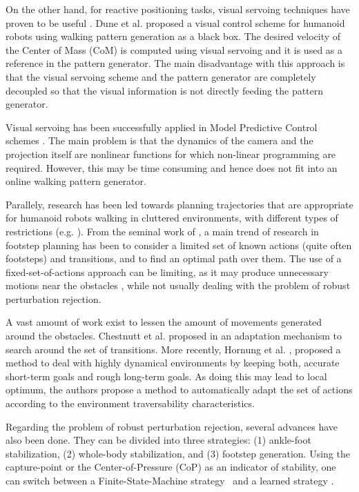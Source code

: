 On the other hand, for reactive positioning tasks, visual servoing techniques have proven to be useful \citep{ChaumetteRAM2006, ChaumetteRAM2007}. Dune et al. \citep{DuneIROS2010} proposed a visual control scheme for humanoid robots using walking pattern generation as a black box. The desired velocity of the Center of Mass (CoM) is computed using visual servoing and it is used as a reference in the pattern generator. The main disadvantage with this approach is that the visual servoing scheme and the pattern generator are completely decoupled so that the visual information is not directly feeding the pattern generator.

Visual servoing has been successfully applied in Model Predictive Control schemes \citep{Allibert2010}. The main problem is that the dynamics of the camera and the projection itself are nonlinear functions for which non-linear programming are required. However, this may be time consuming and hence does not fit into an online walking pattern generator.

Parallely, research has been led towards planning trajectories that are appropriate for humanoid robots walking in cluttered environments, with different types of restrictions (e.g. \citep{Chestnutt2005, jib-IJHR2010}). 
From the seminal work of \citep{Chestnutt2005}, a main trend of research in footstep planning has been to consider a limited set of known actions (quite often footsteps) and transitions, and to find an optimal path over them. The use of a fixed-set-of-actions approach can be limiting, as it may produce unnecessary motions near the obstacles \citep{Bourgeot:IROS:2002}, while not usually dealing with the problem of robust perturbation rejection. 

A vast amount of work exist to lessen the amount of movements generated around the obstacles. Chestnutt et al. proposed in \citep{Chestnutt:ICRA:2007} an adaptation mechanism to search around the set of transitions. More recently, Hornung et al. \citep{Hornung:ICRA:2012}, proposed a method to deal with highly dynamical environments by keeping both, accurate short-term goals and rough long-term goals. As doing this may lead to local optimum, the authors propose a method to automatically adapt the set of actions according to the environment traversability characteristics. 

Regarding the problem of robust perturbation rejection, several advances have also been done. They can be divided into three strategies: (1) ankle-foot stabilization, (2) whole-body stabilization, and (3) footstep generation. 
Using the capture-point or the Center-of-Pressure (CoP) as an indicator of stability, one can switch between a Finite-State-Machine strategy~\citep{Nishiwaki:ijrr:2009} and a learned strategy \citep{SeungJoon:ichr:2011}.

